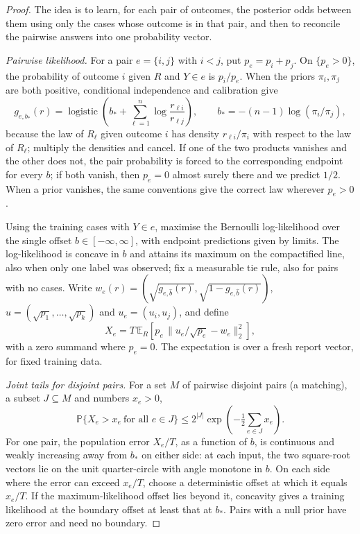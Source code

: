 \documentclass[11pt,a4paper]{article}
\theoremstyle{remark}
\newcommand{\E}{\mathbb E}
\newcommand{\PP}{\mathbb P}
\newcommand{\sig}{\operatorname{logistic}}
\begin{document}
\begin{proof}
The idea is to learn, for each pair of outcomes, the posterior odds between them using only the cases whose outcome is in that pair, and then to reconcile the pairwise answers into one probability vector.

\emph{Pairwise likelihood.}
For a pair $e=\{i,j\}$ with $i<j$, put $p_e=p_i+p_j$. On $\{p_e>0\}$, the probability of outcome $i$ given $R$ and $Y\in e$ is $p_i/p_e$. When the priors $\pi_i,\pi_j$ are both positive, conditional independence and calibration give
\[
 g_{e,b_*}(r)=\sig\!\left(b_*+\sum_{\ell=1}^n\log
                 \frac{r_{\ell i}}{r_{\ell j}}\right),\qquad
 b_*=-(n-1)\log(\pi_i/\pi_j),
\]
because the law of $R_\ell$ given outcome $i$ has density $r_{\ell i}/\pi_i$ with respect to the law of $R_\ell$; multiply the densities and cancel. If one of the two products vanishes and the other does not, the pair probability is forced to the corresponding endpoint for every $b$; if both vanish, then $p_e=0$ almost surely there and we predict $1/2$. When a prior vanishes, the same conventions give the correct law wherever $p_e>0$.

Using the training cases with $Y\in e$, maximise the Bernoulli log-likelihood over the single offset $b\in[-\infty,\infty]$, with endpoint predictions given by limits. The log-likelihood is concave in $b$ and attains its maximum on the compactified line, also when only one label was observed; fix a measurable tie rule, also for pairs with no cases. Write $w_e(r)=(\sqrt{g_{e,\hat b}(r)},\sqrt{1-g_{e,\hat b}(r)})$, $u=(\sqrt{p_1},\ldots,\sqrt{p_k})$ and $u_e=(u_i,u_j)$, and define
\[
 X_e=T\,\E_R\left[p_e\,
   \big\|u_e/\sqrt{p_e}-w_e\big\|_2^2\right],
\]
with a zero summand where $p_e=0$. The expectation is over a fresh report vector, for fixed training data.

\emph{Joint tails for disjoint pairs.}
For a set $M$ of pairwise disjoint pairs (a matching), a subset $J\subseteq M$ and numbers $x_e>0$,
\begin{equation}\label{eq:multitail}
 \PP\{X_e>x_e\ \text{for all } e\in J\}\le
       2^{|J|}\exp\!\left(-\tfrac12\sum_{e\in J}x_e\right).
\end{equation}
For one pair, the population error $X_e/T$, as a function of $b$, is continuous and weakly increasing away from $b_*$ on either side: at each input, the two square-root vectors lie on the unit quarter-circle with angle monotone in $b$. On each side where the error can exceed $x_e/T$, choose a deterministic offset at which it equals $x_e/T$. If the maximum-likelihood offset lies beyond it, concavity gives a training likelihood at the boundary offset at least that at $b_*$. Pairs with a null prior have zero error and need no boundary.


\end{proof}
\end{document}
